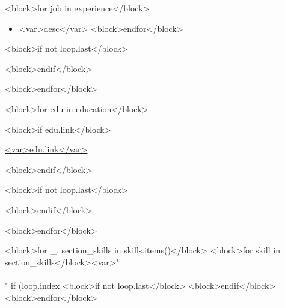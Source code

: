 \documentclass[10pt,a4paper,ragged2e,withhyper]{altacv}
\begin{document}
\begin{paracol}{1}

  <block>for job in experience</block>
  \begin{itemize}
    <block>for desc in job.descriptions</block>
    \item <var>desc</var>
    <block>endfor</block>
  \end{itemize}

  <block>if not loop.last</block>

  \divider

  <block>endif</block>

  <block>endfor</block>

  \medskip


  <block>for edu in education</block>


  <block>if edu.link</block>

    \href{<var>edu.link</var>}{<var>edu.link</var>}

  <block>endif</block>
  
  <block>if not loop.last</block>

  \divider

  <block>endif</block>

  <block>endfor</block>

  \medskip


  <block>for _, section_skills in skills.items()</block>
    <block>for skill in section_skills</block><var>"\\\\" if (loop.index %
  <block>if not loop.last</block>
  \smallskip
  <block>endif</block>
  <block>endfor</block>

\end{paracol}
\end{document}
